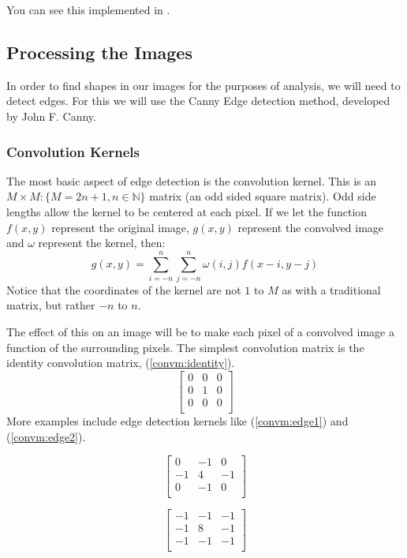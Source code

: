 \documentclass[12pt,english]{article}
\begin{document}
You can see this implemented in .

\subsection{Processing the Images}
In order to find shapes in our images for the purposes of analysis,
we will need to detect edges. For this we will use the Canny Edge
detection method, developed by John F. Canny.

\subsubsection{Convolution Kernels}
The most basic aspect of edge detection is the convolution kernel.
This is an $M{\times}M: \{M=2n+1, n\in\mathbb{N}\}$ matrix
(an odd sided square matrix).
Odd side lengths allow the kernel to be centered at each pixel.  If we let the function $f(x,y)$ represent the original image, $g(x,y)$ represent the convolved image and $\omega$
represent the kernel, then:
\begin{equation}
	g(x,y)=\sum_{i=-n}^{n}\sum_{j=-n}^{n}\omega(i,j)f(x-i,y-j)
\end{equation}
Notice that the coordinates of the kernel are not $1$ to $M$
as with a traditional matrix, but rather $-n$ to $n$.

The effect of this on an image will be to make each pixel of a
convolved image a function of the surrounding pixels.
The simplest convolution matrix is the identity convolution matrix,
(\ref{convm:identity}).
\begin{equation}
	\label{convm:identity}
	\begin{bmatrix}
		0 & 0 & 0\\
		0 & 1 & 0\\
		0 & 0 & 0\\
	\end{bmatrix}
\end{equation}
More examples include edge detection kernels like
(\ref{convm:edge1}) and (\ref{convm:edge2}).
\begin{center}
\begin{minipage}{.4\linewidth}
\begin{equation} \label{convm:edge1}
	\begin{bmatrix}
		 0 & -1 &  0\\
		-1 &  4 & -1\\
		 0 & -1 &  0\\
	\end{bmatrix}
\end{equation}
\end{minipage}
\begin{minipage}{.4\linewidth}
\begin{equation} \label{convm:edge2}
	\begin{bmatrix}
		-1 & -1 & -1\\
		-1 &  8 & -1\\
		-1 & -1 & -1\\
	\end{bmatrix}
\end{equation}
\end{minipage}
\end{center}
\end{document}

